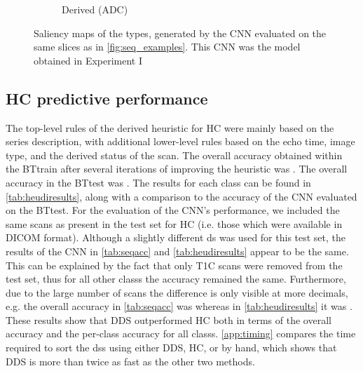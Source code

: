 \begin{figure}
\begin{subfigure}[t]{\figexamplewidth}
        \caption{Derived (ADC)}\label{fig:DWI-DCam}
    \end{subfigure}
    \caption{Saliency maps of the \glspl{type}, generated by the \gls{CNN} evaluated on the same \glspl{slice} as in \cref{fig:seq_examples}. This \gls{CNN} was the model obtained in Experiment I}\label{fig:seq_gradcam}
\end{figure}

\subsection{\acrlong{HC} predictive performance}

The top-level rules of the  derived heuristic for \gls{HC} were mainly based on the series description, with additional lower-level rules based on the echo time, image type, and the derived status of the \gls{scan}.
The overall accuracy obtained within the \gls{BTtrain} after several iterations of improving the heuristic was .
The overall accuracy in the \gls{BTtest} was .
The results for each \gls{class} can be found in \cref{tab:heudiresults}, along with a comparison to the accuracy of the \gls{CNN} evaluated on the \gls{BTtest}.
For the evaluation of the \gls{CNN}'s performance, we included the same \glspl{scan} as present in the test set for \gls{HC} (i.e. those which were available in \gls{DICOM} format).
Although a slightly different \gls{ds} was used for this test set, the results of the \gls{CNN} in \cref{tab:seqacc} and \cref{tab:heudiresults} appear to be the same.
This can be explained by the fact that only \gls{T1C} \glspl{scan} were removed from the test set, thus for all other \glspl{class} the accuracy remained the same.
Furthermore, due to the large number of \glspl{scan} the difference is only visible at more decimals, e.g. the overall accuracy in \cref{tab:seqacc} was  whereas in \cref{tab:heudiresults} it was .
These results show that \gls{DDS} outperformed \gls{HC} both in terms of the overall accuracy and the per-class accuracy for all \glspl{class}.
\cref{app:timing} compares the time required to sort the \glspl{ds} using either \gls{DDS}, \gls{HC}, or by hand, which shows that \gls{DDS} is more than twice as fast as the other two methods.

